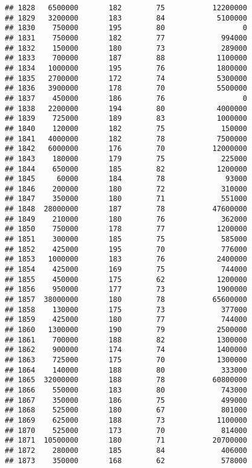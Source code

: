 \documentclass[
]{article}
\begin{document}
\begin{verbatim}
## 1828   6500000       182        75           12200000
## 1829   3200000       183        84            5100000
## 1830    750000       195        80                  0
## 1831    750000       182        77             994000
## 1832    150000       180        73             289000
## 1833    700000       187        88            1100000
## 1834   1000000       195        76            1800000
## 1835   2700000       172        74            5300000
## 1836   3900000       178        70            5500000
## 1837    450000       186        76                  0
## 1838   2200000       194        80            4000000
## 1839    725000       189        83            1000000
## 1840    120000       182        75             150000
## 1841   4000000       182        78            7500000
## 1842   6000000       176        70           12000000
## 1843    180000       179        75             225000
## 1844    650000       185        82            1200000
## 1845     60000       184        78              93000
## 1846    200000       180        72             310000
## 1847    350000       180        71             551000
## 1848  28000000       187        78           47600000
## 1849    210000       180        76             362000
## 1850    750000       178        77            1200000
## 1851    300000       185        75             585000
## 1852    425000       195        70             776000
## 1853   1000000       183        76            2400000
## 1854    425000       169        75             744000
## 1855    450000       175        62            1200000
## 1856    950000       177        73            1900000
## 1857  38000000       180        78           65600000
## 1858    130000       175        73             377000
## 1859    425000       180        77             744000
## 1860   1300000       190        79            2500000
## 1861    700000       188        82            1300000
## 1862    900000       174        74            1400000
## 1863    725000       175        70            1300000
## 1864    140000       188        80             333000
## 1865  32000000       188        78           60800000
## 1866    550000       183        80             743000
## 1867    350000       186        75             499000
## 1868    525000       180        67             801000
## 1869    625000       188        73            1100000
## 1870    525000       173        70             814000
## 1871  10500000       180        71           20700000
## 1872    280000       185        84             406000
## 1873    350000       168        62             578000

\end{verbatim}
\end{document}
